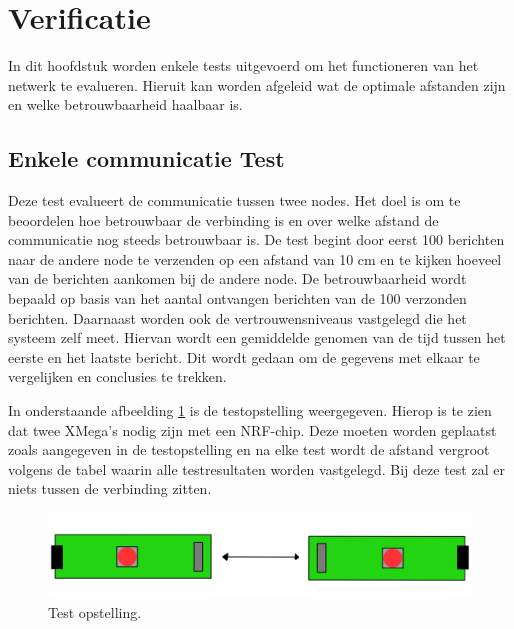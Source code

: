 \section{Verificatie}

In dit hoofdstuk worden enkele tests uitgevoerd om het functioneren van het netwerk te evalueren. Hieruit kan worden afgeleid wat de optimale afstanden zijn en welke betrouwbaarheid haalbaar is.

\subsection{Enkele communicatie Test}
Deze test evalueert de communicatie tussen twee nodes. Het doel is om te beoordelen hoe betrouwbaar de verbinding is en over welke afstand de communicatie nog steeds betrouwbaar is. De test begint door eerst 100 berichten naar de andere node te verzenden op een afstand van 10 cm en te kijken hoeveel van de berichten aankomen bij de andere node. De betrouwbaarheid wordt bepaald op basis van het aantal ontvangen berichten van de 100 verzonden berichten. Daarnaast worden ook de vertrouwensniveaus vastgelegd die het systeem zelf meet. Hiervan wordt een gemiddelde genomen van de tijd tussen het eerste en het laatste bericht. Dit wordt gedaan om de gegevens met elkaar te vergelijken en conclusies te trekken.

In onderstaande afbeelding \ref{fig:TestCom} is de testopstelling weergegeven. Hierop is te zien dat twee XMega's nodig zijn met een NRF-chip. Deze moeten worden geplaatst zoals aangegeven in de testopstelling en na elke test wordt de afstand vergroot volgens de tabel waarin alle testresultaten worden vastgelegd. Bij deze test zal er niets tussen de verbinding zitten.
\begin{figure}[h]
    \centering
    \includegraphics[scale = 0.3]{img/test1.png}
    \caption{Test opstelling.}
    \label{fig:TestCom}
\end{figure}



